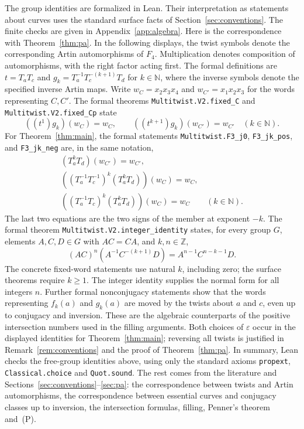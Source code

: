 \documentclass[11pt]{article}
\theoremstyle{remark}
\begin{document}
The group identities are formalized in Lean. Their interpretation as
statements about curves uses the standard surface facts of Section~\ref{sec:conventions}. The finite checks are given in Appendix~\ref{app:algebra}.
Here is the correspondence with
Theorem~\ref{thm:pa}. In the following displays, the twist symbols denote
the corresponding Artin automorphisms of $F_4$. Multiplication denotes composition of
automorphisms, with the right factor acting first. The formal definitions
are $t=T_aT_c$ and $g_k=T_a^{-1}T_c^{-(k+1)}T_d$ for
$k\in\mathbb N$, where the inverse symbols denote the specified inverse
Artin maps. Write $w_C=x_2x_3x_4$ and $w_{C'}=x_1x_2x_3$
for the words representing $C,C'$. The formal theorems
\texttt{Multitwist.V2.fixed\_C} and \texttt{Multitwist.V2.fixed\_Cp} state
\[
 ((t^1)g_k)(w_C)=w_C,\qquad
 ((t^{k+1})g_k)(w_{C'})=w_{C'}\quad(k\in\mathbb N).
\]
For Theorem~\ref{thm:main}, the formal statements
\texttt{Multitwist.F3\_j0}, \texttt{F3\_jk\_pos}, and
\texttt{F3\_jk\_neg} are, in the same notation,
\begin{gather*}
 (T_a^kT_d)(w_{C'})=w_{C'},\\
 ((T_a^{-1}T_c^{-1})^k(T_a^kT_d))(w_C)=w_C,\\
 ((T_a^{-1}T_c)^k(T_a^kT_d))(w_C)=w_C\qquad(k\in\mathbb N).
\end{gather*}
The last two equations are the two signs of the member at exponent $-k$.
The formal theorem \texttt{Multitwist.V2.}\allowbreak\texttt{integer\_identity} states,
for every group $G$, elements $A,C,D\in G$ with $AC=CA$, and
$k,n\in\mathbb Z$,
\[
 (AC)^n(A^{-1}C^{-(k+1)}D)=A^{n-1}C^{n-k-1}D.
\]
The concrete fixed-word statements use natural $k$, including zero;
the surface theorems require $k\ge1$. The integer identity supplies
the normal form for all integers $n$. Further formal nonconjugacy
statements show that the words representing $f_k(a)$ and $g_k(a)$ are
moved by the twists about $a$ and $c$, even up to conjugacy and inversion. These are the algebraic counterparts of
the positive intersection numbers used in the filling arguments.
Both choices of $\varepsilon$ occur in the displayed identities for
Theorem~\ref{thm:main}; reversing all twists is justified in
Remark~\ref{rem:conventions} and the proof of Theorem~\ref{thm:pa}.
In summary, Lean checks the free-group identities above, using only the
standard axioms \texttt{propext}, \texttt{Classical.choice} and
\texttt{Quot.sound}. The rest comes from the
literature and Sections~\ref{sec:conventions}--\ref{sec:pa}: the
correspondence between twists and Artin automorphisms, the correspondence
between essential curves and conjugacy classes up to inversion, the
intersection formulas, filling, Penner's theorem and~(P).
\end{document}
